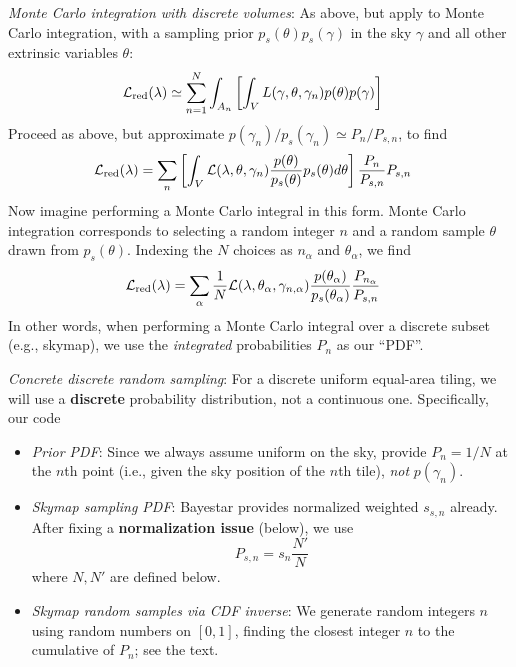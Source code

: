 \noindent \emph{Monte Carlo integration with discrete volumes}: As above, but apply to Monte Carlo integration, with a
sampling prior $p_s(\theta)p_s(\gamma)$ in the sky $\gamma$ and all other extrinsic variables $\theta$:
\begin{align}
{\cal L}_{\rm red}(\lambda)
& \simeq  \sum_{n=1}^N \int_{A_n} \left [\int_V  L(\gamma,\theta,\gamma_n) p(\theta)p(\gamma) \right]
\end{align}
Proceed as above, but approximate $p(\gamma_n)/p_s(\gamma_n) \simeq P_n/P_{s,n}$, to find
\begin{align}
{\cal L}_{\rm red}(\lambda)
& =\sum_n \left[\int_{V}{\cal L}(\lambda,\theta,\gamma_n)\frac{p(\theta)}{p_s(\theta)}p_s(\theta)d\theta \right] \frac{ P_n }{P_{s,n}} P_{s,n}
\end{align}
Now imagine performing a Monte Carlo integral in this form.   Monte Carlo integration corresponds to selecting a random
integer $n$ and a random sample $\theta$ drawn from $p_s(\theta)$.  Indexing the $N$ choices as $n_{\alpha}$ and
$\theta_\alpha$, we find
\begin{align}
{\cal L}_{\rm red}(\lambda)
& = \sum_{\alpha}\frac{1}{N}
{\cal L}(\lambda,\theta_{\alpha},\gamma_{n,\alpha})\frac{p(\theta_\alpha)}{p_s(\theta_\alpha)} \frac{ P_{n_\alpha}
}{P_{s,n}} 
\end{align}
In other words, when performing a Monte Carlo integral over a discrete subset (e.g., skymap), we use the
\emph{integrated} probabilities $P_n$ as our ``PDF''.

\emph{Concrete discrete random sampling}: For a discrete uniform equal-area tiling, we will use a
\textbf{discrete} probability distribution, not a continuous one.   Specifically, our code 
\begin{itemize}
\item \emph{Prior PDF}: Since we always assume uniform on the sky,  provide $P_n=1/N$ at the $n$th
point (i.e., given the sky position of the $n$th tile), \emph{not} $p(\gamma_n)$.

\item \emph{Skymap sampling PDF}: Bayestar provides normalized weighted $s_{s,n}$ already.  After fixing a
  \textbf{normalization issue} (below), we use
\[
P_{s,n} = s_n \frac{N'}{N}
\]
where $N,N'$ are defined below.

\item \emph{Skymap random samples via CDF inverse}: We generate random integers $n$ using random numbers on $[0,1]$, finding the
  closest integer $n$ to the  cumulative of $P_n$; see the text.
\end{itemize}




